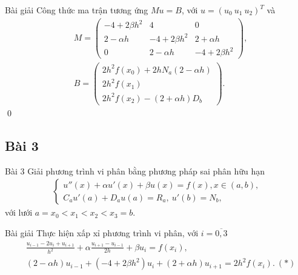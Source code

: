 \documentclass[9pt]{beamer}
\begin{document}
\begin{frame}
    \begin{exampleblock}{Bài giải}
    Công thức ma trận tương ứng $Mu = B$, với $u = (u_0 \  u_1 \  u_2)^T$ và
    \begin{align*}
        & M = \begin{pmatrix}
            -4 + 2\beta h^2 & 4 & 0 \\
            2 - \alpha h & -4 + 2\beta h^2 & 2 + \alpha h \\
            0 & 2 - \alpha h & -4 + 2\beta h^2
        \end{pmatrix}, \\
        & B = \begin{pmatrix}
            2h^2f(x_0) + 2hN_a(2 - \alpha h) \\
            2h^2f(x_1) \\
            2h^2f(x_2) - (2 + \alpha h)D_b
        \end{pmatrix}.
    \end{align*}
    \hfill \qed
    \end{exampleblock}
\end{frame}

\subsection{Bài 3}

\begin{frame}
    \begin{block}{Bài 3}
    Giải phương trình vi phân bằng phương pháp sai phân hữu hạn
    \begin{align*}
        \begin{cases}
        u''(x) + \alpha u'(x) + \beta u(x) = f(x), x \in (a,b), \\
        C_a u'(a) + D_a u(a) = R_a, \  u'(b) = N_b,
        \end{cases}
    \end{align*}
    với lưới $a = x_0 < x_1 < x_2 < x_3 = b$.
    \end{block}
    \begin{exampleblock}{Bài giải}
    Thực hiện xấp xỉ phương trình vi phân, với $i = \overline{0,3}$
    \begin{align*}
        & \frac{u_{i-1} - 2u_i + u_{i+1}}{h^2} + \alpha \frac{u_{i+1} - u_{i-1}}{2h} + \beta u_i = f(x_i), \\
        & (2 - \alpha h) u_{i-1} + (-4 + 2\beta h^2) u_i + (2 + \alpha h) u_{i+1} = 2h^2 f(x_i). \ (*)
    \end{align*}
    \end{exampleblock}
\end{frame}
\end{document}
